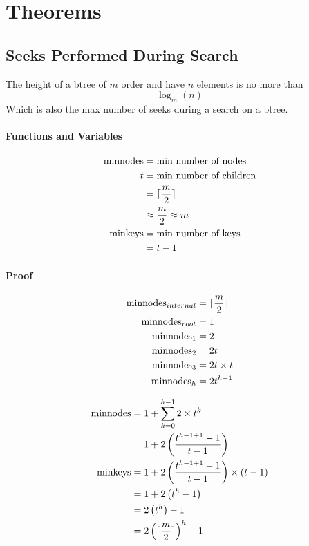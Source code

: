 \section{Theorems}

\subsection{Seeks Performed During Search}

  \begin{theorem}
    The height of a btree of $ m $ order 
    and have $ n $ elements is no more than 
    \begin{displaymath}
      \log_{m} \left( n \right)
    \end{displaymath}
    Which is also the max number of seeks during a search on a btree.
  \end{theorem}
  
  \paragraph{Functions and Variables}
  \begin{align*}
    \operatorname{minnodes} &= \text{min number of nodes} \\ 
    t &= \text{min number of children} \\ 
    &= \lceil \frac{m}{2} \rceil \\
    &\approx \frac{m}{2} \approx m \\
    \operatorname{minkeys} &= \text{min number of keys} \\ 
    &= t - 1
  \end{align*}
  
  \paragraph{Proof}
  \begin{align*}
    \operatorname{minnodes}_{internal} &= \lceil \frac{m}{2} \rceil \\
    \operatorname{minnodes}_{root} &= 1 \\ 
    \operatorname{minnodes}_{1} &= 2 \\ 
    \operatorname{minnodes}_{2} &= 2 t \\
    \operatorname{minnodes}_{3} &= 2 t \times t \\
    \operatorname{minnodes}_{h} &= 2 t^{h - 1} \\
  \end{align*}
  
  \begin{align*}
    \operatorname{minnodes} &= 1 + \sum_{k = 0}^{h - 1} 2 \times t^{k} \\ 
    &= 1 + 2 \left( \frac{ t^{h - 1 + 1} - 1 }{ t - 1 } \right) \\
    \operatorname{minkeys} &= 1 + 2 \left( \frac{ t^{h - 1 + 1} - 1 }{ t - 1 } \right) \times \left( t - 1 \right) \\ 
    &= 1 + 2 \left( t^{h} - 1 \right) \\ 
    &= 2 \left( t^{h} \right) - 1 \\ 
    &= 2 \left( \lceil \frac{m}{2} \rceil \right)^{h} - 1
  \end{align*}
  
